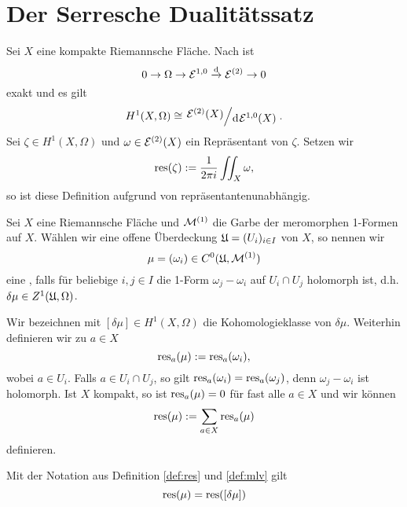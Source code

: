 
\section{Der Serresche Dualitätssatz}
\label{sec:serre}

\begin{defin}
  \label{def:res}
  Sei $X$ eine kompakte Riemannsche Fläche. Nach \cite[Satz 15.14]{For} ist
  \[
  0 \ra \Omega \ra \diff^{1,0} \xrightarrow{\d} \diff^{(2)} \ra 0
  \]
  exakt und es gilt
  \[
  H^1(X, \Omega) \cong \quot{\diff^{(2)}(X)}{\d[\diff^{1,0}(X)]}.
  \]
  Sei $\zeta \in H^1(X,
  \Omega)$ und $\omega \in \mathcal{E}^{(2)}(X)$ ein Repräsentant von
  $\zeta$. Setzen wir
  \[
  \operatorname{res}(\zeta) := \frac{1}{2\pi i} \iint_X \omega,
  \]
  so ist diese Definition aufgrund von \cite[Satz 10.20]{For} repräsentantenunabhängig.
\end{defin}

\begin{defin}
  \label{def:mlv}
  Sei $X$ eine Riemannsche Fläche und $\mathcal{M}^{(1)}$ die Garbe der
  meromorphen 1-Formen auf $X$. Wählen wir eine offene Überdeckung
  $\mathfrak{U} = (U_i)_{i \in I}$ von $X$, so nennen wir
  \[
  \mu = (\omega_i) \in C^0( \mathfrak{U}, \mathcal{M}^{(1)})
  \]
  eine , falls für beliebige $i,j \in
  I$ die 1-Form $\omega_j - \omega_i$ auf $U_i \cap U_j$ holomorph
  ist, d.h. $ \delta \mu \in Z^1(\mathfrak{U}, \Omega)$.

  Wir bezeichnen mit $[\delta \mu] \in H^1(X, \Omega)$ die
  Kohomologieklasse von $\delta \mu$. Weiterhin definieren wir zu $a \in X$
  \[
  \operatorname{res}_a(\mu) := \operatorname{res}_a(\omega_i),
  \]
  wobei $a \in U_i$. Falls $a \in U_i \cap U_j$, so gilt
  $\operatorname{res}_a(\omega_i) = \operatorname{res}_a(\omega_j)$, denn $\omega_j - \omega_i$
  ist holomorph. Ist $X$ kompakt, so ist $\operatorname{res}_a(\mu) = 0$ für fast
  alle $a \in X$ und wir können
  \[
  \operatorname{res}(\mu) := \sum_{a \in X} \operatorname{res}_a(\mu)
  \]
  definieren.
\end{defin}

\begin{thm}
  \label{thm:res}
  Mit der Notation aus Definition \ref{def:res} und \ref{def:mlv} gilt
  \[
  \operatorname{res}(\mu) = \operatorname{res}([\delta \mu])
  \]
\end{thm}

